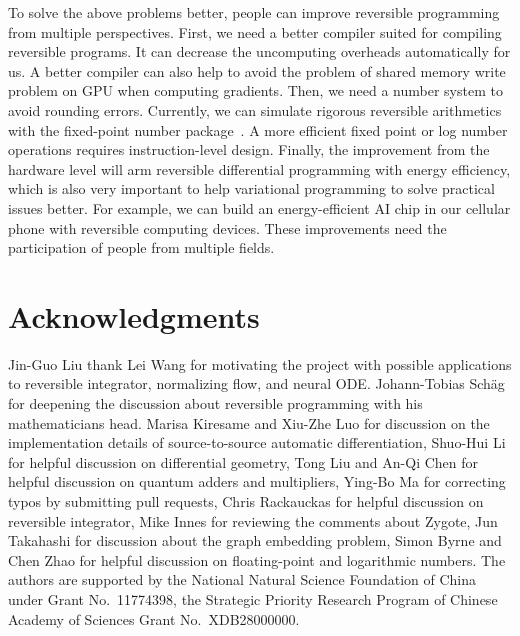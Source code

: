 \documentclass{article}
\newcommand{\<}{\langle}
\renewcommand{\>}{\rangle}
\newcommand{\blue}[1]{[{\bf  \color{blue}{JG: #1}}]}
\newcommand{\orange}[1]{}
\theoremstyle{definition}\newtheorem{definition}{\textit{Definition}}
\begin{document}
To solve the above problems better, people can improve reversible programming from multiple perspectives.\orange{Unless the underlying CPU arch would be reversible, which is not}
First, we need a better compiler suited for compiling reversible programs. It can decrease the uncomputing overheads automatically for us.
A better compiler can also help to avoid the problem of shared memory write problem on GPU when computing gradients.
Then, we need a number system to avoid rounding errors. Currently, we can simulate rigorous reversible arithmetics with the fixed-point number package~\cite{FixedPointNumbers,LogarithmicNumbers}. A more efficient fixed point or log number operations requires instruction-level design.
Finally, the improvement from the hardware level will arm reversible differential programming with energy efficiency, which is also very important to help variational programming to solve practical issues better. For example, we can build an energy-efficient AI chip in our cellular phone with reversible computing devices.
These improvements need the participation of people from multiple fields.


\section{Acknowledgments}
Jin-Guo Liu thank Lei Wang for motivating the project with possible applications to reversible integrator, normalizing flow, and neural ODE.
Johann-Tobias Schäg for deepening the discussion about reversible programming with his mathematicians head.
Marisa Kiresame and Xiu-Zhe Luo for discussion on the implementation details of source-to-source automatic differentiation,
Shuo-Hui Li for helpful discussion on differential geometry, Tong Liu and An-Qi Chen for helpful discussion on quantum adders and multipliers, Ying-Bo Ma for correcting typos by submitting pull requests, Chris Rackauckas for helpful discussion on reversible integrator, Mike Innes for reviewing the comments about Zygote, Jun Takahashi for discussion about the graph embedding problem, Simon Byrne and Chen Zhao for helpful discussion on floating-point and logarithmic numbers.
The authors are supported by the National Natural Science Foundation of China under Grant No.~11774398, the Strategic Priority Research Program of Chinese Academy of Sciences Grant No.~XDB28000000.
\end{document}
